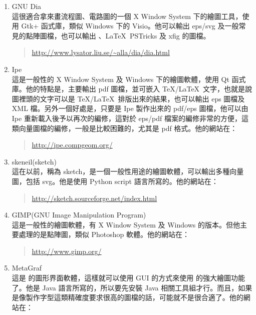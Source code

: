 \begin{enumerate}
  \item {\sffamily GNU Dia}\\
        這很適合拿來畫流程圖、電路圖的一個 X Window System 下的繪圖工具，使用 Gtk+ 函式庫，類似 Windows 下的 {\sffamily Visio}。他可以輸出 eps/svg 及一般常見的點陣圖檔，也可以輸出 \MP{}、\LaTeX\ {\sffamily PSTricks} 及 {\sffamily xfig} 的圖檔。

        \begin{quote}
          \url{http://www.lysator.liu.se/~alla/dia/dia.html}
        \end{quote}

  \item {\sffamily Ipe}\\
        這是一般性的 X Window System 及 Windows 下的繪圖軟體，使用 Qt 函式庫。他的特點是，主要輸出 pdf 圖檔，並可嵌入 \TeX/\LaTeX\ 文字，也就是說圖裡頭的文字可以是 \TeX/\LaTeX\ 排版出來的結果，也可以輸出 eps 圖檔及 XML 檔。另外一個好處是，只要是 {\sffamily Ipe} 製作出來的 pdf/eps 圖檔，他可以由 {\sffamily Ipe} 重新載入後予以再次的編修，這對於 eps/pdf 檔案的編修非常的方便，這類向量圖檔的編修，一般是比較困難的，尤其是 pdf 格式。他的網站在：
        \begin{quote}
          \url{http://ipe.compgeom.org/}
        \end{quote}

  \item {\sffamily skeneil(sketch)} \\
        這在以前，稱為 {\sffamily sketch}，是一個一般性用途的繪圖軟體，可以輸出多種向量圖，包括 svg。他是使用 {\sffamily Python} script 語言所寫的。他的網站在：

        \begin{quote}
          \url{http://sketch.sourceforge.net/index.html}
        \end{quote}

  \item {\sffamily GIMP(GNU Image Manipulation Program)} \\
        這是一般性的繪圖軟體，有 X Window System 及 Windows 的版本。但他主要處理的是點陣圖，類似 {\sffamily Photoshop} 軟體。他的網站在：

        \begin{quote}
          \url{http://www.gimp.org/}
        \end{quote}

  \item {\sffamily MetaGraf}\\
        這是 \MP{} 的圖形界面軟體，這樣就可以使用 GUI 的方式來使用 \MP{} 的強大繪圖功能了。他是 Java 語言所寫的，所以要先安裝 Java 相關工具組才行。而且，如果是像製作字型這類精確度要求很高的圖檔的話，可能就不是很合適了。他的網站在：


\end{enumerate}
